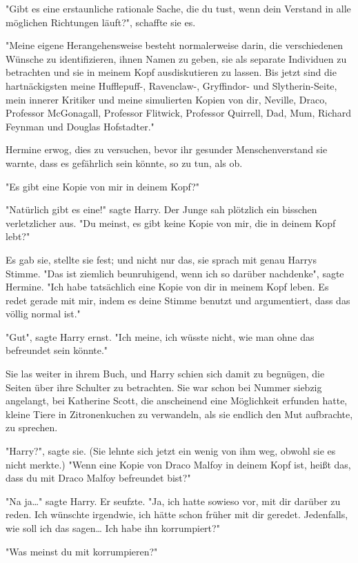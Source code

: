 {"Gibt es eine erstaunliche rationale Sache, die du tust, wenn dein Verstand in alle möglichen Richtungen läuft?", schaffte sie es.

"Meine eigene Herangehensweise besteht normalerweise darin, die verschiedenen Wünsche zu identifizieren, ihnen Namen zu geben, sie als separate Individuen zu betrachten und sie in meinem Kopf ausdiskutieren zu lassen. Bis jetzt sind die hartnäckigsten meine Hufflepuff-, Ravenclaw-, Gryffindor- und Slytherin-Seite, mein innerer Kritiker und meine simulierten Kopien von dir, Neville, Draco, Professor McGonagall, Professor Flitwick, Professor Quirrell, Dad, Mum, Richard Feynman und Douglas Hofstadter."

Hermine erwog, dies zu versuchen, bevor ihr gesunder Menschenverstand sie warnte, dass es gefährlich sein könnte, so zu tun, als ob.

"Es gibt eine Kopie von mir in deinem Kopf?"

"Natürlich gibt es eine!" sagte Harry. Der Junge sah plötzlich ein bisschen verletzlicher aus. "Du meinst, es gibt keine Kopie von mir, die in deinem Kopf lebt?"

Es gab sie, stellte sie fest; und nicht nur das, sie sprach mit genau Harrys Stimme. "Das ist ziemlich beunruhigend, wenn ich so darüber nachdenke", sagte Hermine. "Ich habe tatsächlich eine Kopie von dir in meinem Kopf leben. Es redet gerade mit mir, indem es deine Stimme benutzt und argumentiert, dass das völlig normal ist."

"Gut", sagte Harry ernst. "Ich meine, ich wüsste nicht, wie man ohne das befreundet sein könnte."

Sie las weiter in ihrem Buch, und Harry schien sich damit zu begnügen, die Seiten über ihre Schulter zu betrachten. Sie war schon bei Nummer siebzig angelangt, bei Katherine Scott, die anscheinend eine Möglichkeit erfunden hatte, kleine Tiere in Zitronenkuchen zu verwandeln, als sie endlich den Mut aufbrachte, zu sprechen.

"Harry?", sagte sie. (Sie lehnte sich jetzt ein wenig von ihm weg, obwohl sie es nicht merkte.) "Wenn eine Kopie von Draco Malfoy in deinem Kopf ist, heißt das, dass du mit Draco Malfoy befreundet bist?"

"Na ja…" sagte Harry. Er seufzte. "Ja, ich hatte sowieso vor, mit dir darüber zu reden. Ich wünschte irgendwie, ich hätte schon früher mit dir geredet. Jedenfalls, wie soll ich das sagen… Ich habe ihn korrumpiert?"

"Was meinst du mit korrumpieren?"

}
